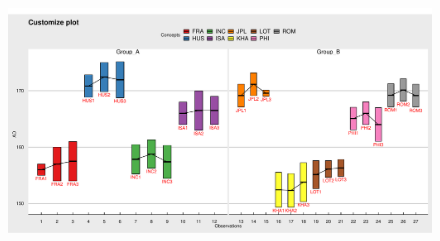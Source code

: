 \documentclass[article]{jss}
\begin{document}
\begin{appendix}
\begin{figure}[t!]
\centering
\includegraphics[width=1\textwidth]{pic/customize} 
\caption{\label{fig:customize}}
\end{figure}




\end{appendix}
\end{document}

